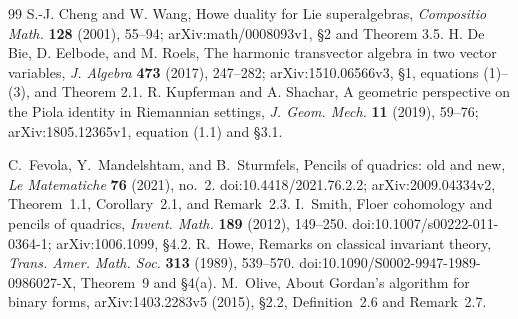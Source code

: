 \begin{thebibliography}{99}
S.-J. Cheng and W. Wang, Howe duality for Lie superalgebras,
\emph{Compositio Math.} \textbf{128} (2001), 55--94;
arXiv:math/0008093v1, \S2 and Theorem 3.5.
H. De Bie, D. Eelbode, and M. Roels,
The harmonic transvector algebra in two vector variables,
\emph{J. Algebra} \textbf{473} (2017), 247--282;
arXiv:1510.06566v3, \S1, equations (1)--(3), and Theorem 2.1.
R. Kupferman and A. Shachar,
A geometric perspective on the Piola identity in Riemannian settings,
\emph{J. Geom. Mech.} \textbf{11} (2019), 59--76;
arXiv:1805.12365v1, equation (1.1) and \S3.1.

C.~Fevola, Y.~Mandelshtam, and B.~Sturmfels,
Pencils of quadrics: old and new,
\emph{Le Matematiche} \textbf{76} (2021), no.~2.
doi:10.4418/2021.76.2.2; arXiv:2009.04334v2,
Theorem~1.1, Corollary~2.1, and Remark~2.3.
I.~Smith, Floer cohomology and pencils of quadrics,
\emph{Invent. Math.} \textbf{189} (2012), 149--250.
doi:10.1007/s00222-011-0364-1; arXiv:1006.1099, \S4.2.
R.~Howe, Remarks on classical invariant theory,
\emph{Trans. Amer. Math. Soc.} \textbf{313} (1989), 539--570.
doi:10.1090/S0002-9947-1989-0986027-X,
Theorem~9 and \S4(a).
M.~Olive, About Gordan's algorithm for binary forms,
arXiv:1403.2283v5 (2015), \S2.2,
Definition~2.6 and Remark~2.7.
\end{thebibliography}
